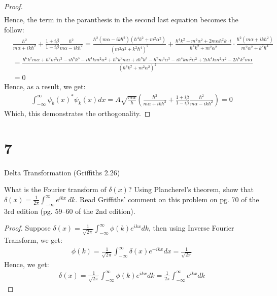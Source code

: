 \documentclass{article}
\begin{document}
\begin{proof}
\begin{align}
    \end{align}
    Hence, the term in the paranthesis in the second last equation becomes the follow:
    \begin{align}
        &\frac{\hbar^2}{m\alpha+ik\hbar^2} + \frac{1+i\beta}{1-i\beta}\frac{\hbar^2}{m\alpha-ik\hbar^2} = \frac{\hbar^2(m\alpha-ik\hbar^2)(\hbar^4k^2+m^2\alpha^2)}{(m^2\alpha^2+k^2\hbar^4)^2}+\frac{\hbar^4k^2 - m^2\alpha^2 + 2m\alpha\hbar^2k\cdot i}{\hbar^4k^2+m^2\alpha^2}\cdot \frac{\hbar^2(m\alpha+ik\hbar^2)}{m^2\alpha^2+k^2\hbar^4}\\
        &= \frac{\hbar^6k^2m\alpha+\hbar^2m^3\alpha^3-i\hbar^8k^3-i\hbar^4km^2\alpha^2+\hbar^6k^2m\alpha+i\hbar^8k^3-\hbar^2m^3\alpha^3-i\hbar^4km^2\alpha^2+2i\hbar^4km^2\alpha^2-2\hbar^6k^2m\alpha}{(\hbar^4k^2+m^2\alpha^2)^2}\\
        &= 0
    \end{align}
    Hence, as a result, we get:
    \begin{align}
        \int_{-\infty}^{\infty}\psi_b(x)^*\psi_k(x)dx = A\sqrt{\frac{m\alpha}{\hbar}}\left(\frac{\hbar^2}{m\alpha+ik\hbar^2}+\frac{1+i\beta}{1-i\beta}\frac{\hbar^2}{m\alpha-ik\hbar^2}\right) = 0
    \end{align}
    Which, this demonstrates the orthogonality.
\end{proof}

\newpage

\section*{7}
\begin{ques}\label{q7}
Delta Transformation (Griffiths 2.26)

What is the Fourier transform of $\delta(x)$? Using Plancherel’s theorem, show that $\delta(x) = \frac{1}{2\pi} \int_{-\infty}^{\infty} e^{i k x} \, dk.$ Read Griffiths’ comment on this problem on pg. 70 of the 3rd edition (pg. 59–60 of the 2nd edition).
\end{ques}

\begin{proof}
    Suppose $\delta(x)=\frac{1}{\sqrt{2\pi}}\int_{-\infty}^{\infty}\phi(k)e^{ikx}dk$, then using Inverse Fourier Transform, we get: 
    \begin{align}
        \phi(k)=\frac{1}{\sqrt{2\pi}}\int_{-\infty}^{\infty}\delta(x)e^{-ikx}dx = \frac{1}{\sqrt{2\pi}}
    \end{align}
    Hence, we get:
    \begin{align}
        \delta(x)=\frac{1}{\sqrt{2\pi}}\int_{-\infty}^{\infty}\phi(k)e^{ikx}dk = \frac{1}{2\pi}\int_{-\infty}^{\infty}e^{ikx}dk
    \end{align}
\end{proof}
\end{document}

